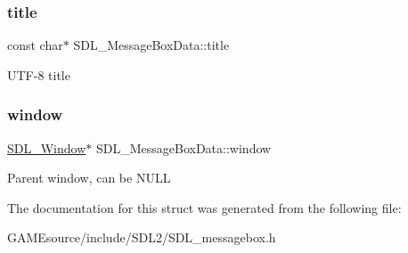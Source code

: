 \subsubsection{\texorpdfstring{title}{title}}
{\footnotesize\ttfamily const char$\ast$ S\+D\+L\+\_\+\+Message\+Box\+Data\+::title}

U\+T\+F-\/8 title \mbox{\label{struct_s_d_l___message_box_data_a5c333bc93705c66068e140bc28daedcb}} 
\subsubsection{\texorpdfstring{window}{window}}
{\footnotesize\ttfamily \mbox{\hyperlink{_s_d_l__video_8h_a55a196c7d3b8497538632c79ae1e6392}{S\+D\+L\+\_\+\+Window}}$\ast$ S\+D\+L\+\_\+\+Message\+Box\+Data\+::window}

Parent window, can be N\+U\+LL 

The documentation for this struct was generated from the following file\+:\begin{DoxyCompactItemize}
\item 
G\+A\+M\+Esource/include/\+S\+D\+L2/S\+D\+L\+\_\+messagebox.\+h\end{DoxyCompactItemize}
